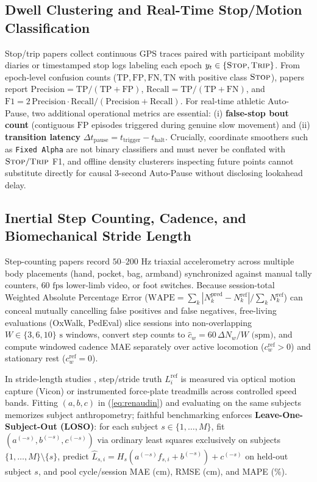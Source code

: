\documentclass[journal]{IEEEtran}
\begin{document}
\subsection{Dwell Clustering and Real-Time Stop/Motion Classification}
Stop/trip papers \cite{zheng2009mining} collect continuous GPS traces paired with participant mobility diaries or timestamped stop logs labeling each epoch $y_t \in \{\textsc{Stop}, \textsc{Trip}\}$. From epoch-level confusion counts ($\mathrm{TP}, \mathrm{FP}, \mathrm{FN}, \mathrm{TN}$ with positive class $\textsc{Stop}$), papers report $\mathrm{Precision} = \mathrm{TP}/(\mathrm{TP}+\mathrm{FP})$, $\mathrm{Recall} = \mathrm{TP}/(\mathrm{TP}+\mathrm{FN})$, and $\mathrm{F1} = 2\,\mathrm{Precision}\cdot\mathrm{Recall}/(\mathrm{Precision}+\mathrm{Recall})$. For real-time athletic Auto-Pause, two additional operational metrics are essential: (i) \textbf{false-stop bout count} (contiguous $\mathrm{FP}$ episodes triggered during genuine slow movement) and (ii) \textbf{transition latency} $\Delta t_{\text{pause}} = t_{\text{trigger}} - t_{\text{halt}}$. Crucially, coordinate smoothers such as \texttt{Fixed Alpha} are not binary classifiers and must never be conflated with $\textsc{Stop}/\textsc{Trip}$ F1, and offline density clusterers inspecting future points cannot substitute directly for causal 3-second Auto-Pause without disclosing lookahead delay.

\subsection{Inertial Step Counting, Cadence, and Biomechanical Stride Length}
Step-counting papers \cite{salvi2018oxford,xu2022step} record $50\text{--}200\text{ Hz}$ triaxial accelerometry across multiple body placements (hand, pocket, bag, armband) synchronized against manual tally counters, $60\text{ fps}$ lower-limb video, or foot switches. Because session-total Weighted Absolute Percentage Error ($\mathrm{WAPE} = \sum_k |N_k^{\text{pred}} - N_k^{\text{ref}}| / \sum_k N_k^{\text{ref}}$) can conceal mutually cancelling false positives and false negatives, free-living evaluations (OxWalk, PedEval) slice sessions into non-overlapping $W \in \{3, 6, 10\}\text{ s}$ windows, convert step counts to $\hat{c}_w = 60\,\Delta N_w / W\text{ (spm)}$, and compute windowed cadence MAE separately over active locomotion ($c_w^{\text{ref}} > 0$) and stationary rest ($c_w^{\text{ref}} = 0$).

In stride-length studies \cite{renaudin2012step,fukuchi2017public}, step/stride truth $L_i^{\text{ref}}$ is measured via optical motion capture (Vicon) or instrumented force-plate treadmills across controlled speed bands. Fitting $(a,b,c)$ in (\ref{eq:renaudin}) and evaluating on the same subjects memorizes subject anthropometry; faithful benchmarking enforces \textbf{Leave-One-Subject-Out (LOSO)}: for each subject $s \in \{1,\dots,M\}$, fit $(a^{(-s)}, b^{(-s)}, c^{(-s)})$ via ordinary least squares exclusively on subjects $\{1,\dots,M\}\setminus\{s\}$, predict $\hat{L}_{s,i} = H_s(a^{(-s)} f_{s,i} + b^{(-s)}) + c^{(-s)}$ on held-out subject $s$, and pool cycle/session MAE ($\text{cm}$), RMSE ($\text{cm}$), and MAPE ($\%$).
\end{document}
